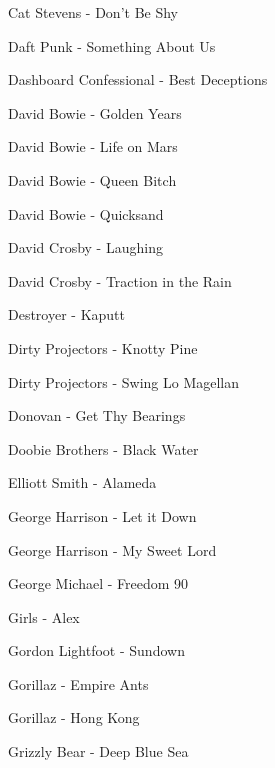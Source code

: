 Cat Stevens - Don't Be Shy \dotfill \pageref{Don't Be Shy - Cat Stevens} 

Daft Punk - Something About Us \dotfill \pageref{Something About Us - Daft Punk} 

Dashboard Confessional - Best Deceptions \dotfill \pageref{Best Deceptions - Dashboard Confessional} 

David Bowie - Golden Years \dotfill \pageref{Golden Years - David Bowie} 

David Bowie - Life on Mars \dotfill \pageref{Life on Mars - David Bowie} 

David Bowie - Queen Bitch \dotfill \pageref{Queen Bitch - David Bowie} 

David Bowie - Quicksand \dotfill \pageref{Quicksand - David Bowie} 

David Crosby - Laughing \dotfill \pageref{Laughing - David Crosby} 

David Crosby - Traction in the Rain \dotfill \pageref{Traction in the Rain - David Crosby} 

Destroyer - Kaputt \dotfill \pageref{Kaputt - Destroyer} 

Dirty Projectors - Knotty Pine \dotfill \pageref{Knotty Pine - Dirty Projectors} 

Dirty Projectors - Swing Lo Magellan \dotfill \pageref{Swing Lo Magellan - Dirty Projectors} 

Donovan - Get Thy Bearings \dotfill \pageref{Get Thy Bearings - Donovan} 

Doobie Brothers - Black Water \dotfill \pageref{Black Water - Doobie Brothers} 

Elliott Smith - Alameda \dotfill \pageref{Alameda - Elliott Smith} 

George Harrison - Let it Down \dotfill \pageref{Let it Down - George Harrison} 

George Harrison - My Sweet Lord \dotfill \pageref{My Sweet Lord - George Harrison} 

George Michael - Freedom 90 \dotfill \pageref{Freedom 90 - George Michael} 

Girls - Alex \dotfill \pageref{Alex - Girls} 

Gordon Lightfoot - Sundown \dotfill \pageref{Sundown - Gordon Lightfoot} 

Gorillaz - Empire Ants \dotfill \pageref{Empire Ants - Gorillaz} 

Gorillaz - Hong Kong \dotfill \pageref{Hong Kong - Gorillaz} 

Grizzly Bear - Deep Blue Sea \dotfill \pageref{Deep Blue Sea - Grizzly Bear} 


